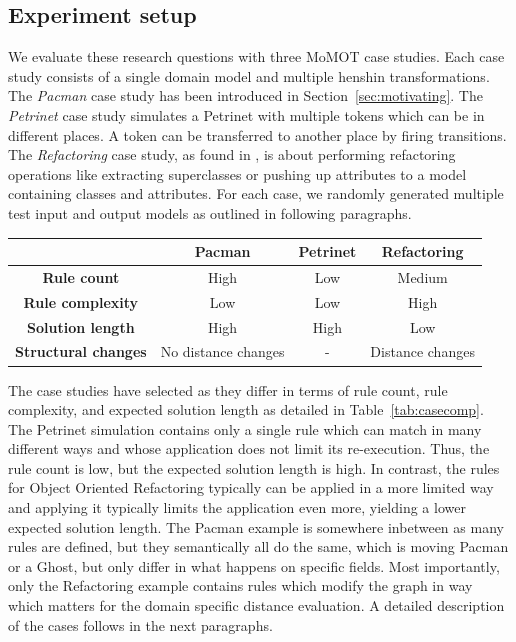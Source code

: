 \subsection{Experiment setup}


We evaluate these research questions with three MoMOT case studies. Each case study consists of a single domain model and multiple henshin transformations.
The \textit{Pacman} case study has been introduced in Section~\ref{sec:motivating}. The \textit{Petrinet} case study simulates a Petrinet with multiple tokens which can be in different places. A token can be transferred to another place by firing transitions. The \textit{Refactoring} case study, as found in \cite{?}, is about performing refactoring operations like extracting superclasses or pushing up attributes to a model containing classes and attributes.
For each case, we randomly generated multiple test input and output models as outlined in following paragraphs.

\begin{table}
\begin{tabular}{|c|c|c|c|}
\hline 
 & \textbf{Pacman} & \textbf{Petrinet} & \textbf{Refactoring} \\
\hline
\textbf{Rule count} & High & Low & Medium \\
\hline
\textbf{Rule complexity} & Low & Low & High \\
\hline
\textbf{Solution length} & High & High & Low \\
\hline
\textbf{Structural changes} & No distance changes & - & Distance changes \\
\hline
\end{tabular}
\end{table}

The case studies have selected as they differ in terms of rule count, rule complexity, and expected solution length as detailed in Table~\ref{tab:casecomp}.
The Petrinet simulation contains only a single rule which can match in many different ways and whose application does not limit its re-execution. Thus, the rule count is low, but the expected solution length is high. In contrast, the rules for Object Oriented Refactoring typically can be applied in a more limited way and applying it typically limits the application even more, yielding a lower expected solution length. The Pacman example is somewhere inbetween as many rules are defined, but they semantically all do the same, which is moving Pacman or a Ghost, but only differ in what happens on specific fields. 
Most importantly, only the Refactoring example contains rules which modify the graph in way which matters for the domain specific distance evaluation. A detailed description of the cases follows in the next paragraphs.


